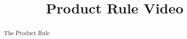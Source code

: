 \documentclass[handout]{ximera}
\title{Product Rule Video}
\begin{document}
\begin{abstract}
The Product Rule
\end{abstract}

\maketitle

\end{document}
